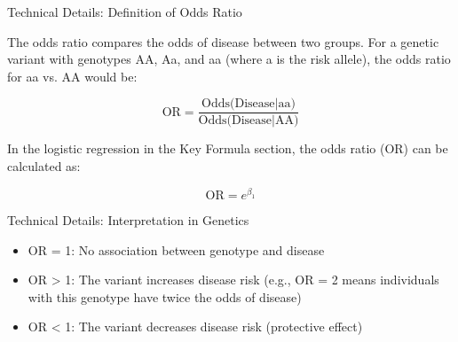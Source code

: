 \begin{frame}{Technical Details: Definition of Odds Ratio}

The odds ratio compares the odds of disease between two groups. For a genetic variant with genotypes AA, Aa, and aa (where a is the risk allele), the odds ratio for aa vs. AA would be:

$$
\text{OR} = \frac{\text{Odds(Disease|aa)}}{\text{Odds(Disease|AA)}}
$$

In the logistic regression in the Key Formula section, the odds ratio (OR) can be calculated as:

$$
\text{OR} = e^{\beta_1}
$$

\end{frame}

\begin{frame}{Technical Details: Interpretation in Genetics}

\begin{itemize}
\item OR = 1: No association between genotype and disease
\item OR > 1: The variant increases disease risk (e.g., OR = 2 means individuals with this genotype have twice the odds of disease)
\item OR < 1: The variant decreases disease risk (protective effect)
\end{itemize}

\end{frame}

